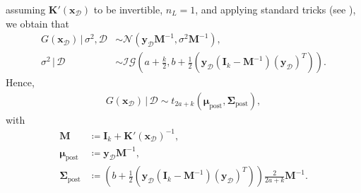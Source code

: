\documentclass[a4paper, 11pt, reqno]{amsart}
\theoremstyle{plain}
\theoremstyle{remark}
\theoremstyle{definition}
\newcommand{\given}{\, | \,}
\newcommand{\normal}[2]{\mathcal{N}\left(#1, #2\right)}
\newcommand{\invgamma}[2]{\mathcal{IG}\left(#1, #2\right)}
\newcommand{\tstud}[3]{t_{#1}\left(#2, #3\right)}
\newcommand{\train}{\mathcal{D}}
\begin{document}
assuming $\bm{K}'(\bm{x}_{\mathcal{D}})$ to be invertible, $n_L = 1$, and applying standard tricks (see ), we obtain that
\begin{equation*}
    \begin{aligned}
        G(\bm{x}_{\mathcal{D}}) \given \sigma^2, \train & \sim \normal{\bm{y}_{\mathcal{D}} \bm{M}^{-1}}{\sigma^2 \bm{M}^{-1}}, \\
        \sigma^{2} \given \train & \sim \invgamma{a + \frac{k}{2}}{b + \frac{1}{2} \left(\bm{y}_{\mathcal{D}} \left(\bm{I}_{k} - \bm{M}^{-1}\right) (\bm{y}_{\mathcal{D}})^T\right)}.
    \end{aligned}
\end{equation*}
Hence,
\begin{equation*}
    \begin{aligned}
        G(\bm{x}_{\mathcal{D}}) \given \train \sim \tstud{2a + k}{\bm{\mu}_{\mathrm{post}}}{\bm{\Sigma}_{\mathrm{post}}},
    \end{aligned}
\end{equation*}
with
\begin{equation} \label{eq:tstudpostparams}
    \begin{aligned}
        \bm{M} & \coloneqq \bm{I}_{k} + \bm{K}'(\bm{x}_{\mathcal{D}})^{-1}, \\
        \bm{\mu}_{\mathrm{post}} & \coloneqq \bm{y}_{\mathcal{D}} \bm{M}^{-1}, \\
        \bm{\Sigma}_{\mathrm{post}} & \coloneqq \left(b + \frac{1}{2} \left(\bm{y}_{\mathcal{D}} \left(\bm{I}_{k} - \bm{M}^{-1}\right) (\bm{y}_{\mathcal{D}})^T\right)\right) \frac{2}{2a + k} \bm{M}^{-1}.
    \end{aligned}
\end{equation}
\end{document}
